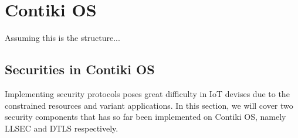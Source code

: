 \chapter{Contiki OS}
Assuming this is the structure...

\section{Securities in Contiki OS}

%
%
%
%
%

Implementing security protocols poses great difficulty in IoT devises due to the constrained resources and variant applications. In this section, we will cover two security components that has so far been implemented on Contiki OS, namely LLSEC and DTLS respectively.

